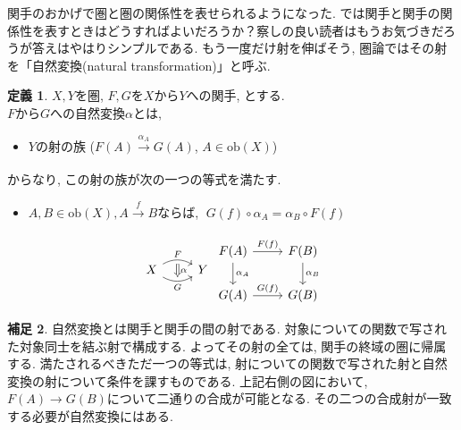 \documentclass[a4paper]{jsarticle}
\theoremstyle{definition}
\newtheorem{dfn}{定義}[section]
\newtheorem{hsk}[dfn]{補足}
\newcommand{\ob}{{\mathrm{ob}}}
\begin{document}
関手のおかげで圏と圏の関係性を表せられるようになった. では関手と関手の関係性を表すときはどうすればよいだろうか？察しの良い読者はもうお気づきだろうが答えはやはりシンプルである. もう一度だけ射を伸ばそう, 圏論ではその射を「自然変換(natural transformation)」と呼ぶ.
\begin{dfn}
    $X, Y$を圏, $F, G$を$X$から$Y$への関手, とする.\\
    $F$から$G$への自然変換$\alpha$とは,
    \begin{itemize}
        \item $Y$の射の族 ($F(A)\xrightarrow[]{\alpha_A} G(A)$, $A\in\ob(X)$)
    \end{itemize}
    からなり, この射の族が次の一つの等式を満たす.
    \begin{itemize}
        \item $A, B\in\ob(X), A\xrightarrow[]{f}B$ならば, $\; G(f)\circ \alpha_A = \alpha_B\circ F(f)$
    \end{itemize}
\end{dfn}
\begin{equation}
\begin{tikzcd}
X
\arrow[r, bend left, "F"]
\arrow[r, bend right, swap, "G"]
\arrow[r, phantom, bend left, shift right=0.2ex, ""{name=U}]
\arrow[r, phantom, bend right, shift left=0.2ex, swap, ""{name=D}]
&Y
\arrow[Rightarrow, from=U, to=D, "\alpha"]
\end{tikzcd}
     \begin{tikzcd}
        F(A)\arrow{r}{F(f)} \arrow{d}{\alpha_A} & F(B)\arrow{d}{\alpha_B}\\
        G(A)\arrow{r}{G(f)} & G(B)
    \end{tikzcd}
\end{equation}
\begin{hsk}
    自然変換とは関手と関手の間の射である. 対象についての関数で写された対象同士を結ぶ射で構成する. よってその射の全ては, 関手の終域の圏に帰属する. 満たされるべきただ一つの等式は, 射についての関数で写された射と自然変換の射について条件を課すものである. 上記右側の図において, $F(A)\rightarrow G(B)$について二通りの合成が可能となる. その二つの合成射が一致する必要が自然変換にはある.\\
\end{hsk}
\end{document}
